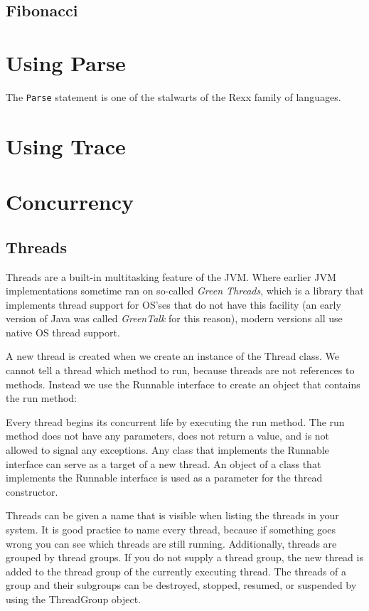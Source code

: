 \section{Fibonacci}

\chapter{Using Parse}
The \texttt{Parse} statement is one of the stalwarts of the Rexx
family of languages. 
\chapter{Using Trace}

\chapter{Concurrency}
\section{Threads}
Threads are a built-in multitasking feature of the JVM. Where earlier
JVM implementations sometime ran on so-called \emph{Green Threads},
which is a library that implements thread support for OS'ses that do
not have this facility (an
early version of Java was called \emph{GreenTalk} for this reason), modern versions
all use native OS thread support. 

A new thread is created when we create an instance of the Thread class. We cannot tell a thread which method to run, because threads are not references to methods. Instead we use the Runnable interface to create an object that contains the run method:

Every thread begins its concurrent life by executing the run method. The run method does not have any parameters, does not return a value, and is not allowed to signal any exceptions.
Any class that implements the Runnable interface can serve as a target of a new thread. An object of a class that implements the Runnable interface is used as a parameter for the thread constructor.

Threads can be given a name that is visible when listing the threads in your system. It is good practice to name every thread, because if something goes wrong you can see which threads are still running.
Additionally, threads are grouped by thread groups. If you do not
supply a thread group, the new thread is added to the thread group of
the currently executing thread. The threads of a group and their
subgroups can be destroyed, stopped, resumed, or suspended by using
the ThreadGroup object. 

